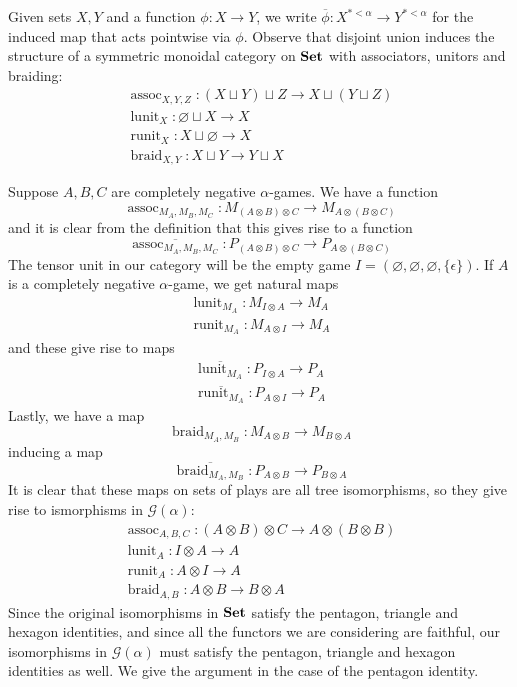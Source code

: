 \documentclass[11pt]{article} %
\theoremstyle{plain} %
\theoremstyle{definition} %
\theoremstyle{note}
\theoremstyle{exercisestyle}
\newcommand{\catname}[1]{{\normalfont\textbf{#1}}}
\newcommand{\Set}{\catname{Set}}
\newcommand*\from{\colon}
\newcommand{\cmap}[3]{#1\from{}#2\to{}#3}
\newcommand{\tensor}{\otimes}
\newcommand{\cprd}{\sqcup}
\newcommand{\G}{\mathcal G}
\newcommand{\emptyplay}{\epsilon}
\DeclareMathOperator{\assoc}{assoc}
\DeclareMathOperator{\lunit}{lunit}
\DeclareMathOperator{\runit}{runit}
\DeclareMathOperator{\braid}{braid}
\let\emptyset\varnothing
\begin{document}
Given sets $X,Y$ and a function $\cmap{\phi}{X}{Y}$, we write $\overline\phi\from X^{*<\alpha}\to Y^{*<\alpha}$ for the induced map that acts pointwise via $\phi$.  Observe that disjoint union induces the structure of a symmetric monoidal category on $\Set$ with associators, unitors and braiding:
\begin{gather*}
  \assoc_{X,Y,Z}\from (X\cprd Y)\cprd Z\to X\cprd(Y\cprd Z)\\
  \lunit_X\from \emptyset\cprd X\to X\\
  \runit_X\from X\cprd\emptyset\to X\\
  \braid_{X,Y}\from X\cprd Y\to Y\cprd X
\end{gather*}

Suppose $A,B,C$ are completely negative $\alpha$-games.  We have a function
\[
  \assoc_{M_A,M_B,M_C}\from M_{(A\tensor B)\tensor C}\to M_{A\tensor(B\tensor C)}
  \]
and it is clear from the definition that this gives rise to a function
\[
  \overline{\assoc_{M_A,M_B,M_C}}\from P_{(A\tensor B)\tensor C}\to P_{A\tensor(B\tensor C)}
  \]
The tensor unit in our category will be the empty game $I=(\emptyset, \emptyset, \emptyset, \{\emptyplay\})$.  If $A$ is a completely negative $\alpha$-game, we get natural maps
\begin{gather*}
  \lunit_{M_A}\from M_{I\tensor A}\to M_A \\
  \runit_{M_A}\from M_{A\tensor I}\to M_A
\end{gather*}
and these give rise to maps
\begin{gather*}
  \overline{\lunit_{M_A}}\from P_{I\tensor A}\to P_A\\
  \overline{\runit_{M_A}}\from P_{A\tensor I}\to P_A
\end{gather*}
Lastly, we have a map
\[
  \braid_{M_A,M_B}\from M_{A\tensor B}\to M_{B\tensor A}
  \]
inducing a map
\[
  \overline{\braid_{M_A,M_B}}\from P_{A\tensor B}\to P_{B\tensor A}
  \]
It is clear that these maps on sets of plays are all tree isomorphisms, so they give rise to ismorphisms in $\G(\alpha)$:
\begin{gather*}
  \assoc_{A,B,C}\from (A\tensor B)\tensor C\to A\tensor (B\tensor B)\\
  \lunit_A\from I\tensor A\to A\\
  \runit_A\from A\tensor I\to A\\
  \braid_{A,B}\from A\tensor B\to B\tensor A
\end{gather*}
Since the original isomorphisms in $\Set$ satisfy the pentagon, triangle and hexagon identities, and since all the functors we are considering are faithful, our isomorphisms in $\G(\alpha)$ must satisfy the pentagon, triangle and hexagon identities as well.  We give the argument in the case of the pentagon identity.  
\end{document}

